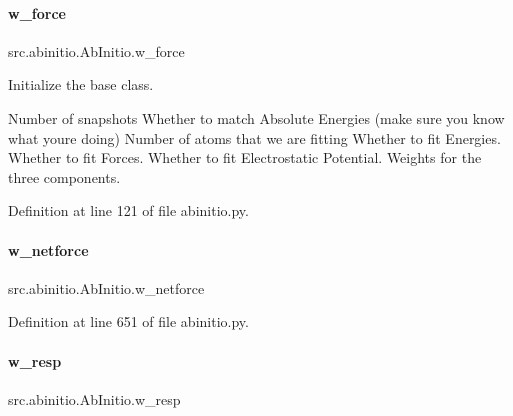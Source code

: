 \mbox{\label{classsrc_1_1abinitio_1_1AbInitio_a57931eef3ca6d8ac0ade2ffc1f008ef4}} 
\paragraph{\texorpdfstring{w\+\_\+force}{w\_force}}
{\footnotesize\ttfamily src.\+abinitio.\+Ab\+Initio.\+w\+\_\+force}



Initialize the base class. 

Number of snapshots Whether to match Absolute Energies (make sure you know what you\textquotesingle{}re doing) Number of atoms that we are fitting Whether to fit Energies. Whether to fit Forces. Whether to fit Electrostatic Potential. Weights for the three components. 

Definition at line 121 of file abinitio.\+py.

\mbox{\label{classsrc_1_1abinitio_1_1AbInitio_ad62612a970e3d20e9ce975134cced90a}} 
\paragraph{\texorpdfstring{w\+\_\+netforce}{w\_netforce}}
{\footnotesize\ttfamily src.\+abinitio.\+Ab\+Initio.\+w\+\_\+netforce}



Definition at line 651 of file abinitio.\+py.

\mbox{\label{classsrc_1_1abinitio_1_1AbInitio_a88f678514f8b84c1ba3038d049818f66}} 
\paragraph{\texorpdfstring{w\+\_\+resp}{w\_resp}}
{\footnotesize\ttfamily src.\+abinitio.\+Ab\+Initio.\+w\+\_\+resp}



